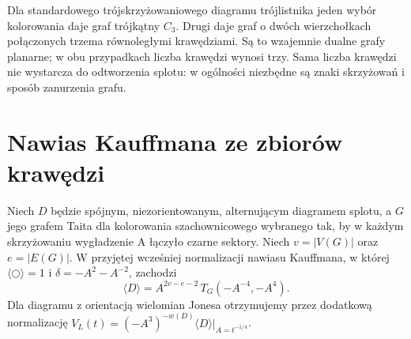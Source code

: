 \begin{przyklad}
Dla standardowego trójskrzyżowaniowego diagramu trójlistnika
jeden wybór kolorowania daje graf trójkątny $C_3$.
Drugi daje graf o dwóch wierzchołkach połączonych trzema
równoległymi krawędziami. Są to wzajemnie dualne grafy
planarne; w obu przypadkach liczba krawędzi wynosi trzy.
Sama liczba krawędzi nie wystarcza do odtworzenia splotu:
w ogólności niezbędne są znaki skrzyżowań i sposób
zanurzenia grafu.
\end{przyklad}

\begin{center}
\end{center}

\section{Nawias Kauffmana ze zbiorów krawędzi}
\label{sec:tg-tait-tutte}

\begin{twierdzenie}
\label{thm:tg-tait-tutte}
Niech $D$ będzie spójnym, niezorientowanym, alternującym
diagramem splotu, a $G$ jego grafem Taita dla kolorowania
szachownicowego wybranego tak, by w każdym skrzyżowaniu
wygładzenie A łączyło czarne sektory. Niech
$v=|V(G)|$ oraz $e=|E(G)|$. W przyjętej wcześniej
normalizacji nawiasu Kauffmana, w której
$\langle\bigcirc\rangle=1$ i
$\delta=-A^2-A^{-2}$, zachodzi
\[
\langle D\rangle
=A^{2v-e-2}\,T_G(-A^{-4},-A^4).
\]
Dla diagramu z orientacją wielomian Jonesa otrzymujemy
przez dodatkową normalizację
$V_L(t)=(-A^3)^{-w(D)}\langle D\rangle\big|_{A=t^{-1/4}}$.
\end{twierdzenie}

